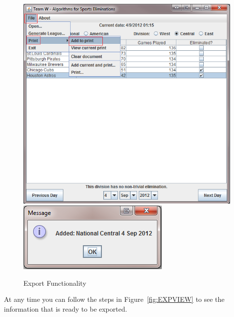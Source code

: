 \begin{figure}
  \includegraphics[width=\linewidth,keepaspectratio]{images/userManualDesk9.png}
  \includegraphics{images/userManualDesk10.png}
  \caption{Export Functionality}\label{fig:EXPORT}
\end{figure}


At any time you can follow the steps in Figure~\ref{fig:EXPVIEW} to
see the information that is ready to be exported.

